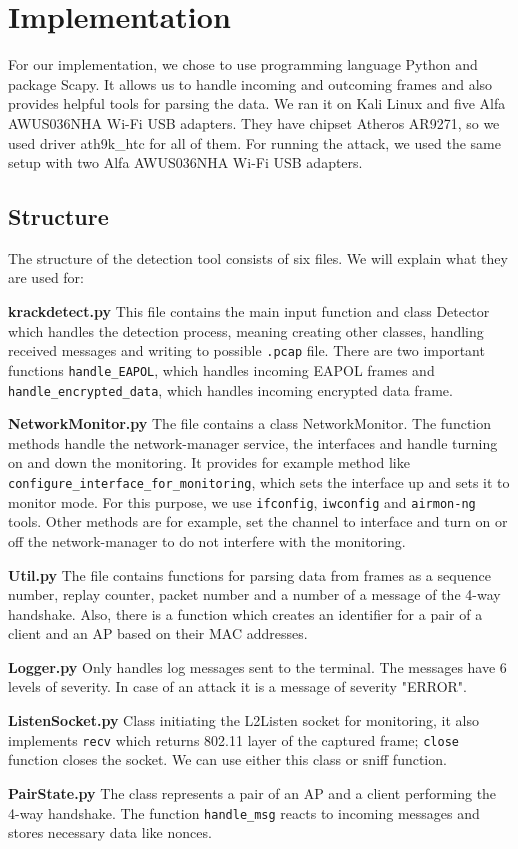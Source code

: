 \chapter{Implementation}
\label{chap:implementation}

For our implementation, we chose to use programming language Python and package Scapy. It allows us to handle incoming and outcoming frames and also provides helpful tools for parsing the data. We ran it on Kali Linux and five Alfa AWUS036NHA Wi-Fi USB adapters. They have chipset Atheros AR9271, so we used driver ath9k\_htc for all of them. For running the attack, we used the same setup with two Alfa AWUS036NHA Wi-Fi USB adapters.

\section{Structure}
The structure of the detection tool consists of six files. We will explain what they are used for:

\begin{description}
\item \textbf{krackdetect.py} This file contains the main input function and class Detector which handles the detection process, meaning creating other classes, handling received messages and writing to possible \texttt{.pcap} file. There are two important functions \texttt{handle\_EAPOL}, which handles incoming EAPOL frames and \texttt{handle\_encrypted\_data}, which handles incoming encrypted data frame.
\item \textbf{NetworkMonitor.py} The file contains a class NetworkMonitor. The function methods handle the network-manager service, the interfaces and handle turning on and down the monitoring. It provides for example method like \texttt{configure\_interface\_for\_monitoring}, which sets the interface up and sets it to monitor mode. For this purpose, we use \texttt{ifconfig}, \texttt{iwconfig} and \texttt{airmon-ng} tools. Other methods are for example, set the channel to interface and turn on or off the network-manager to do not interfere with the monitoring.
\item \textbf{Util.py} The file contains functions for parsing data from frames as a sequence number, replay counter, packet number and a number of a message of the 4-way handshake. Also, there is a function which creates an identifier for a pair of a client and an AP based on their MAC addresses.
\item \textbf{Logger.py} Only handles log messages sent to the terminal. The messages have 6 levels of severity. In case of an attack it is a message of severity "ERROR".
\item \textbf{ListenSocket.py} Class initiating the L2Listen socket for monitoring, it also implements \texttt{recv} which returns 802.11 layer of the captured frame; \texttt{close} function closes the socket. We can use either this class or sniff function.
\item \textbf{PairState.py} The class represents a pair of an AP and a client performing the 4-way handshake. The function \texttt{handle\_msg} reacts to incoming messages and stores necessary data like nonces.  
\end{description}

